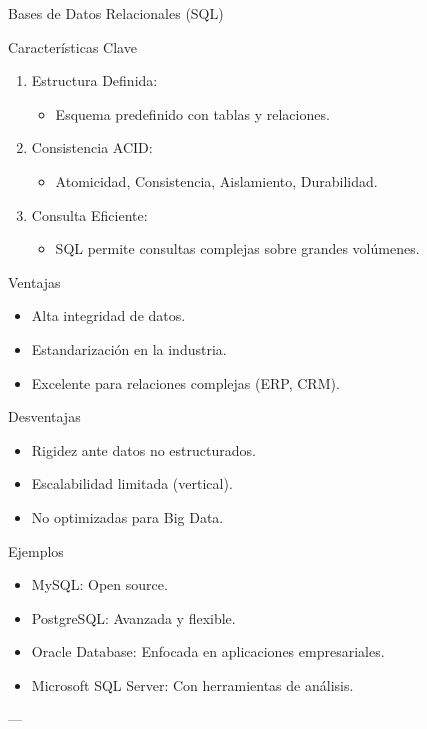 \documentclass[presentation]{beamer}
\begin{document}
\begin{frame}[label={sec:org97f129f}]{Bases de Datos Relacionales (SQL)}
\begin{block}{Características Clave}
\begin{enumerate}
\item \alert{\alert{Estructura Definida}}:
\begin{itemize}
\item Esquema predefinido con tablas y relaciones.
\end{itemize}
\item \alert{\alert{Consistencia ACID}}:
\begin{itemize}
\item Atomicidad, Consistencia, Aislamiento, Durabilidad.
\end{itemize}
\item \alert{\alert{Consulta Eficiente}}:
\begin{itemize}
\item SQL permite consultas complejas sobre grandes volúmenes.
\end{itemize}
\end{enumerate}
\end{block}

\begin{block}{Ventajas}
\begin{itemize}
\item Alta integridad de datos.
\item Estandarización en la industria.
\item Excelente para relaciones complejas (ERP, CRM).
\end{itemize}
\end{block}

\begin{block}{Desventajas}
\begin{itemize}
\item Rigidez ante datos no estructurados.
\item Escalabilidad limitada (vertical).
\item No optimizadas para Big Data.
\end{itemize}
\end{block}

\begin{block}{Ejemplos}
\begin{itemize}
\item \alert{\alert{MySQL}}: Open source.
\item \alert{\alert{PostgreSQL}}: Avanzada y flexible.
\item \alert{\alert{Oracle Database}}: Enfocada en aplicaciones empresariales.
\item \alert{\alert{Microsoft SQL Server}}: Con herramientas de análisis.
\end{itemize}

---
\end{block}
\end{frame}
\end{document}
